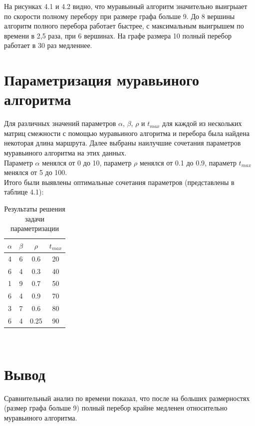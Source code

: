 \documentclass[12pt]{report}
\begin{document}
На рисунках 4.1 и 4.2 видно, что муравьиный алгоритм значительно выигрыает по скорости полному перебору при размере графа больше 9.
До 8 вершины алгоритм полного перебора работает быстрее, с максимальным выигрышем по времени в 2,5 раза, при 6 вершинах.
На графе размера 10 полный перебор работает в 30 раз медленнее. 

\section{Параметризация муравьиного алгоритма}	

Для различных значений параметров $\alpha$, $\beta$, $\rho$ и $t_{max}$ для каждой из нескольких матриц смежности с помощью муравьиного алгоритма и перебора была найдена некоторая длина маршрута. Далее выбраны наилучшие сочетания параметров муравьиного алгоритма на этих данных.\\
Параметр $\alpha$ менялся от 0 до 10, параметр $\rho$ менялся от 0.1 до 0.9, параметр $t_{max}$ менялся от 5 до 100.\\
Итого были выявлены оптимальные сочетания параметров (представлены в таблице 4.1):\\

\begin{table}
	\caption{Результаты решения задачи параметризации}
	\begin{center}
		
	\begin{tabular}{|c|c|c|c|}
		\hline
		$\alpha$ &$\beta$ & $\rho$ & $t_{max}$ \\\hline
		4&6&0.6&20\\
		6&4&0.3&40\\
		 1&9&0.7&50\\
		 6&4&0.9&70\\
		 3&7&0.6&80\\
		 6&4&0.25&90\\
		 \hline
	\end{tabular}
\end{center}
\end{table} 
\

\section*{Вывод}
Сравнительный анализ по времени показал, что после на больших размерностях (размер графа больше 9) полный перебор крайне медленен относительно муравьиного алгоритма.
\end{document}
